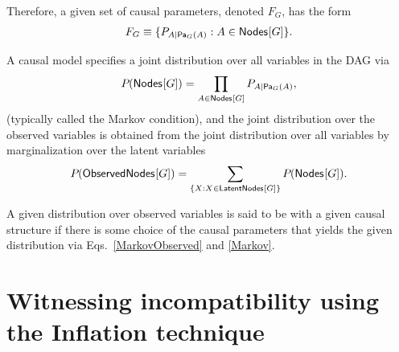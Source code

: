 Therefore, a given set of causal parameters, denoted $F_G$, has the form
\begin{align}
F_G \equiv \{ \pfunc{A|\Pa[G]{A}} : A \in \SmallNamedFunction{Nodes}{G} \}.
\end{align}

A causal model specifies a joint distribution over all variables in the DAG via
\begin{align}\label{Markov}
\pdf{\SmallNamedFunction{Nodes}{G}} = \prod_{A\in \SmallNamedFunction{Nodes}{G}} \pfunc{A|\Pa[G]{A}},
\end{align}
(typically called the Markov condition), 
and the joint distribution over the observed variables is obtained from the joint distribution over all variables by marginalization over the latent variables 
\begin{align}\label{MarkovObserved}
\pdf{\SmallNamedFunction{ObservedNodes}{G}} =  \sum_{\{X :X \in\SmallNamedFunction{LatentNodes}{G}\}} \pdf{\SmallNamedFunction{Nodes}{G}}.
\end{align}

A given distribution over observed variables is said to be  with a given causal structure if there is some choice of the causal parameters that yields the given distribution via Eqs.~\eqref{MarkovObserved} and \eqref{Markov}.


\section{Witnessing incompatibility using the Inflation technique}


